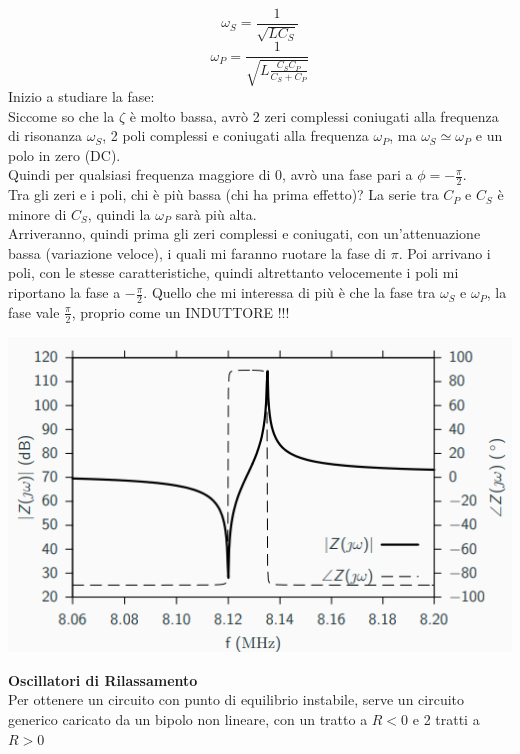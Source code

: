 \documentclass{article}
\begin{document}
\begin{equation}
    \omega_{S}=\frac{1}{\sqrt{LC_{S}}}
\end{equation}
\begin{equation}
    \omega_{P}=\frac{1}{\sqrt{L\frac{C_{S}C_{P}}{C_{S}+C_{P}}}}
\end{equation}
\newpage
\noindent
Inizio a studiare la fase:\\
Siccome so che la $\zeta$ è molto bassa, avrò 2 zeri complessi coniugati alla frequenza di risonanza $\omega_{S}$, 2 poli complessi e coniugati alla frequenza $\omega_{P}$, ma $\omega_{S}\simeq\omega_{P}$ e un polo in zero (DC).\\
Quindi per qualsiasi frequenza maggiore di 0, avrò una fase pari a $\phi=-\frac{\pi}{2}$.\\
Tra gli zeri e i poli, chi è più bassa (chi ha prima effetto)? La serie tra $C_{P}$ e $C_{S}$ è minore di $C_{S}$, quindi la $\omega_{P}$ sarà più alta.\\
Arriveranno, quindi prima gli zeri complessi e coniugati, con un'attenuazione bassa (variazione veloce), i quali mi faranno ruotare la fase di $\pi$.
Poi arrivano i poli, con le stesse caratteristiche, quindi altrettanto velocemente i poli mi riportano la fase a $-\frac{\pi}{2}$.
Quello che mi interessa di più è che la fase tra $\omega_{S}$ e $\omega_{P}$, la fase vale $\frac{\pi}{2}$, proprio come un INDUTTORE !!!
\begin{center}
    \includegraphics[scale=0.8]{Quarzo.png}
\end{center}
\vspace{0.4mm}
\textbf{Oscillatori di Rilassamento}\\
Per ottenere un circuito con punto di equilibrio instabile, serve un circuito generico caricato da un bipolo non lineare, con un tratto a $R<0$ e 2 tratti a $R>0$
\end{document}
